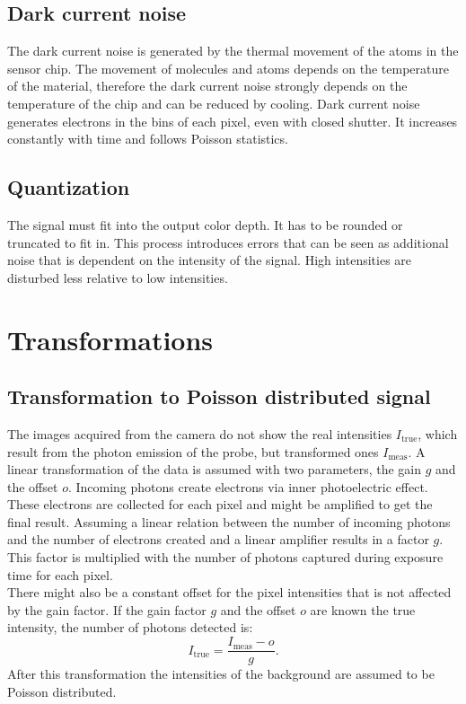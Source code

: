 \subsection{Dark current noise}
The dark current noise is generated by the thermal movement of the atoms in the sensor chip. The movement of molecules and atoms depends on the temperature of the material, therefore the dark current noise strongly depends on the temperature of the chip and can be reduced by cooling. Dark current noise generates electrons in the bins of each pixel, even with closed shutter. It increases constantly with time and follows Poisson statistics.
\subsection{Quantization}
The signal must fit into the output color depth. It has to be rounded or truncated to fit in. This process introduces errors that can be seen as additional noise that is dependent on the intensity of the signal. High intensities are disturbed less relative to low intensities.


\section{Transformations}
\subsection{Transformation to Poisson distributed signal} \label{trafoPoiss}
The images acquired from the camera do not show the real intensities
$I_\text{true}$, which result from the photon emission of the probe, but
transformed ones $I_\text{meas}$.\newline
A linear transformation of the data is assumed with two parameters, the gain $g$ and the offset $o$.
Incoming photons create electrons via inner photoelectric effect. These electrons
are collected for each pixel and might be amplified to get the final result.
Assuming a linear relation between the number of incoming photons and the number
of electrons created and a linear amplifier results in a factor $g$. This factor
is multiplied with the number of photons captured during exposure time for each
pixel.\\
There might also be a constant offset for the pixel intensities that is not affected by the gain factor.
If the gain factor $g$ and the offset $o$ are known the true intensity, the
number of photons detected is:
\begin{equation}
	I_\text{true} = \dfrac{I_\text{meas}-o}{g}. \label{transtopoiss}
\end{equation}
After this transformation the intensities of the background are assumed to be Poisson distributed.
